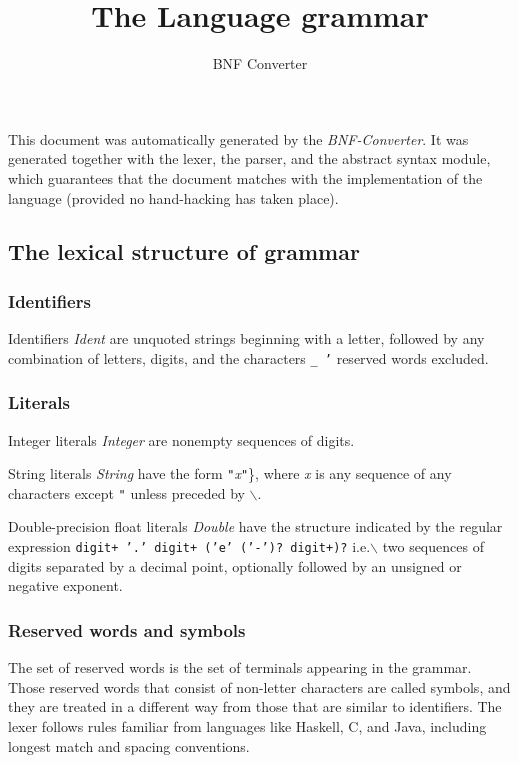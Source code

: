 \documentclass{article}
\title{The Language grammar}
\author{BNF Converter}
\begin{document}
\maketitle
\clearpage


This document was automatically generated by the \textit{BNF-Converter}. It was generated together with the lexer, the parser, and the abstract syntax module, which guarantees that the document matches with the implementation of the language (provided no hand-hacking has taken place).

\subsection*{The lexical structure of grammar}

\subsubsection*{Identifiers}

Identifiers \textit{Ident} are unquoted strings beginning with a letter,
followed by any combination of letters, digits, and the characters \texttt{\_ '}
reserved words excluded.

\subsubsection*{Literals}

Integer literals \textit{Integer} are nonempty sequences of digits.

String literals \textit{String} have the form
\texttt{"}\textit{x}\texttt{"}\}, where \textit{x} is any sequence of any characters
except \texttt{"} unless preceded by \texttt{$\backslash$}.

Double-precision float literals \textit{Double} have the structure
indicated by the regular expression \texttt{digit+ '.' digit+ ('e' ('-')? digit+)?} i.e.$\backslash$
two sequences of digits separated by a decimal point, optionally
followed by an unsigned or negative exponent.

\subsubsection*{Reserved words and symbols}

The set of reserved words is the set of terminals appearing in the grammar. Those reserved words that consist of non-letter characters are called symbols, and they are treated in a different way from those that are similar to identifiers. The lexer follows rules familiar from languages like Haskell, C, and Java, including longest match and spacing conventions.
\end{document}
